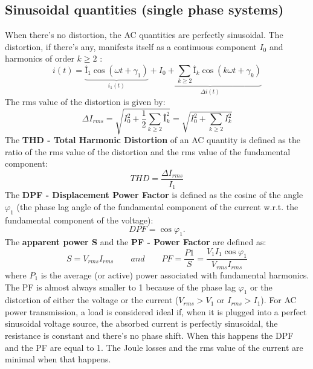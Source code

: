 	\subsection{Sinusoidal quantities (single phase systems)}
	    When there's no distortion, the AC quantities are perfectly sinusoidal. The distortion, if there's any, manifests itself as a continuous component $I_0$ and harmonics of order $k\geq 2$ :
		\begin{equation}
			i(t) = \underbrace{Î_1\cos (\omega t+\gamma _1)}_{i_1(t)} + \underbrace{I_0 + \sum _ {k\geq 2} Î_k \cos (k\omega t + \gamma _k)}_{\Delta i(t)}
		\end{equation}
		The rms value of the distortion is given by: 
		\begin{equation}
			\Delta I_{rms} = \sqrt{I_0^2+\frac{1}{2}\sum _{k\geq 2} Î_k^2} = \sqrt{I_0^2+ \sum _{k\geq 2} I_k^2}
		\end{equation}
		The \textbf{THD - Total Harmonic Distortion} of an AC quantity is defined as the ratio of the rms value of the distortion and the rms value of the fundamental component:
		\begin{equation}
			THD = \frac{\Delta I_{rms}}{I_1}
		\end{equation}
		The \textbf{DPF - Displacement Power Factor} is defined as the cosine of the angle $\varphi _1$ (the phase lag angle of the fundamental component of the current w.r.t. the fundamental component of the voltage): 
		\begin{equation}
			DPF = \cos \varphi _1.
		\end{equation}
		The \textbf{apparent power S} and the \textbf{PF - Power Factor} are defined as:
		\begin{equation}
			S = V_{rms}I_{rms} \qquad and \qquad PF = \frac{P1}{S} = \frac{V_1I_1\cos \varphi _1}{V_{rms}I_{rms}}
		\end{equation}
		where $P_1$ is the average (or active) power associated with fundamental harmonics. The PF is almost always smaller to 1 because of the phase lag $\varphi _1$ or the distortion of either the voltage or the current ($V_{rms}>V_1$ or $I_{rms}>I_1$). For AC power transmission, a load is considered ideal if, when it is plugged into a perfect sinusoidal voltage source, the absorbed current is perfectly sinusoidal, the resistance is constant and there's no phase shift. When this happens the DPF and the PF are equal to 1. The Joule losses and the rms value of the current are minimal when that happens. 
		
